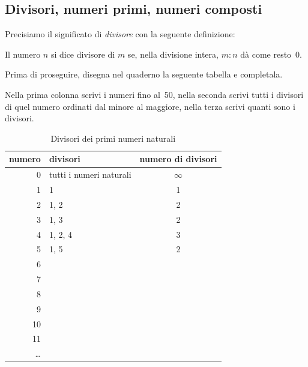 
\subsection{Divisori, numeri primi, numeri composti}

Precisiamo il significato di \emph{divisore} con la seguente definizione:

\begin{definizione}
 Il numero \(n\) si dice divisore di \(m\) se, nella divisione intera, 
 \(m : n\) dà come resto~0.
\end{definizione}

Prima di proseguire, disegna nel quaderno la seguente tabella e completala. 
 
Nella prima colonna scrivi i numeri fino al~50, nella seconda scrivi tutti 
i divisori di quel numero ordinati dal minore al maggiore, nella terza 
scrivi quanti sono i divisori.

\begin{table}[h]
\centering
\caption{Divisori dei primi numeri naturali}
\begin{tabular}{|r|p{6cm}|c|}
\hline
\textsf{\relax 
numero
} & \textsf{\relax 
          divisori          
} & \textsf{\relax 
numero di divisori
}\\
\hline
0 & tutti i numeri naturali & \(\infty\)\\
\hline
1 & 1 & 1\\
\hline
2 & 1, 2 & 2\\
\hline
3 & 1, 3 & 2\\
\hline
4 & 1, 2, 4 & 3\\
\hline
5 & 1, 5 & 2\\
\hline
6 &  & \\
\hline
7 &  & \\
\hline
8 &  & \\
\hline
9 &  & \\
\hline
10 &  & \\
\hline
11 &  & \\
\hline
\dots &  & \\
\hline
\end{tabular}
\end{table}

